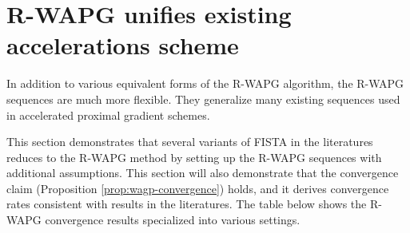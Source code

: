 \documentclass[12pt]{article}
\begin{document}
\section{R-WAPG unifies existing accelerations scheme}\label{sec:rwapg-literatures}
    In addition to various equivalent forms of the R-WAPG algorithm, the R-WAPG sequences are much more flexible. 
    They generalize many existing sequences used in accelerated proximal gradient schemes. 
    \par
    This section demonstrates that several variants of FISTA in the literatures reduces to the R-WAPG method by setting up the R-WAPG sequences with additional assumptions. 
    This section will also demonstrate that the convergence claim (Proposition \ref{prop:wagp-convergence}) holds, and it derives convergence rates consistent with results in the literatures.  
    The table below shows the R-WAPG convergence results specialized into various settings. 
\end{document}
